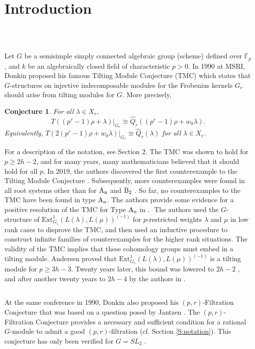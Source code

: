 \documentclass[twoside,11pt,reqno]{amsart}
\newcommand{\0}{\bar 0}
\newcommand{\1}{\bar 1}
\newtheorem{conj}{Conjecture}[subsection]
\theoremstyle{definition}
\numberwithin{equation}{subsection}
\begin{document}
\section{Introduction}
﻿
\subsection{} Let $G$ be a semisimple simply connected algebraic group (scheme) defined over ${\mathbb F}_{p}$, and $k$ be an algebraically closed field of characteristic $p>0$. 
In 1990 at MSRI, Donkin \cite{Don93} proposed his famous Tilting Module Conjecture (TMC) which states that $G$-structures on injective indecomposable modules for
the Frobenius kernels $G_{r}$ should arise from tilting modules for $G$. More precisely, 
﻿
\begin{conj}\label{C:TMC} For all $\lambda\in X_{r}$, 
$$T((p^{r}-1)\rho+\lambda)|_{G_{r}}\cong\widehat{Q}_{r}((p^{r}-1)\rho+w_{0}\lambda).$$
Equivalently, $T(2(p^{r}-1)\rho+w_{0}\lambda)|_{G_{r}}\cong \widehat{Q}_{r}(\lambda)$ for all $\lambda\in X_{r}$. 
\end{conj}
For a description of the notation, see Section 2. The TMC was shown to hold for $p \geq 2h-2$, and for many years, many mathematicians believed that it should hold for all $p$. 
﻿
In 2019, the authors discovered the first counterexample to the Tilting Module Conjecture \cite{BNPS20}. Subsequently, more counterexamples were found in all root systems other than for $\rm{A}_{n}$ and $\rm{B}_{2}$ \cite{BNPS22b}.
So far, no counterexamples to the TMC have been found in type $\rm{A}_n$. The authors provide some evidence for a positive resolution of the TMC for Type $\rm{A}_n$ in \cite{BNPS26}. 
﻿
The authors used the $G$-structure of $\text{Ext}^{1}_{G_{1}}(L(\lambda),L(\mu))^{(-1)}$ for $p$-restricted weights $\lambda$ and $\mu$ in low rank cases to disprove the TMC, and then used 
an inductive procedure to construct infinite families of counterexamples for the higher rank situations. The validity of the TMC implies that these cohomology groups must embed in a tilting module. 
Andersen \cite{And84} proved that  $\text{Ext}^{1}_{G_{1}}(L(\lambda),L(\mu))^{(-1)}$ is a tilting module for $p\geq 3h - 3$. Twenty years later, this bound was lowered to $2h-2$ \cite{BNP04}, 
and after another twenty years to $2h-4$ by the authors in \cite{BNPS24}. 
﻿
\subsection{} At the same conference in 1990, Donkin also proposed his $(p,r)$-Filtration Conjecture that was based on a question posed by Jantzen \cite{Jan80}. The $(p,r)$-Filtration Conjecture 
provides a necessary and sufficient condition for a rational $G$-module to admit a good $(p,r)$-filtration (cf. Section \ref{S:notation}). This conjecture has only been verified for 
$G=SL_{2}$ \cite{And01}.  
\end{document}
